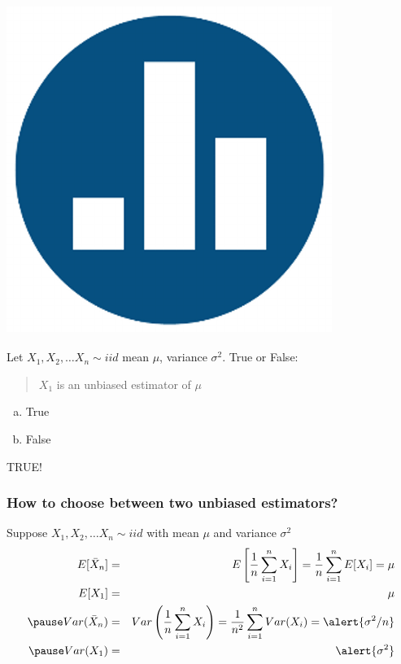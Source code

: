 \begin{frame}
\frametitle{\includegraphics[scale = 0.05]{./images/clicker}}
Let $X_1, X_2, \hdots X_n \sim iid$ mean $\mu$, variance $\sigma^2$. True or False:

\vspace{1em}
\begin{quotation}
$X_1$ is an unbiased estimator of $\mu$
\end{quotation}

\begin{enumerate}[(a)]
\item True
\item False
\end{enumerate}

\pause \alert{TRUE!}
\end{frame}
\begin{frame}
\frametitle{How to choose between two unbiased estimators?}

Suppose $X_1, X_2, \hdots X_n \sim iid$ with mean $\mu$ and variance $\sigma^2$
\begin{eqnarray*}
E[\bar{X}_n] &=& E\left[\frac{1}{n}\sum_{i=1}^n X_i\right] = \frac{1}{n}\sum_{i=1}^n E[X_i] = \mu\\
E[X_1] &=& \mu\\
\pause
Var(\bar{X}_n) &=& Var\left(\frac{1}{n}\sum_{i=1}^n X_i\right) = \frac{1}{n^2} \sum_{i=1}^n Var(X_i) = \alert{\sigma^2/n}\\
\pause
Var(X_1) &=& \alert{\sigma^2}
\end{eqnarray*}
\end{frame}

